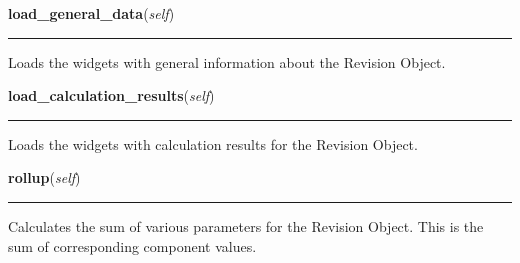 \hspace{.8\funcindent}\begin{boxedminipage}{\funcwidth}

    \raggedright \textbf{load\_general\_data}(\textit{self})

    \vspace{-1.5ex}

    \rule{\textwidth}{0.5\fboxrule}
\setlength{\parskip}{2ex}
    Loads the widgets with general information about the Revision Object.

\setlength{\parskip}{1ex}
    \end{boxedminipage}

    \label{reliafree:revision:Revision:load_calculation_results}

    \vspace{0.5ex}

\hspace{.8\funcindent}\begin{boxedminipage}{\funcwidth}

    \raggedright \textbf{load\_calculation\_results}(\textit{self})

    \vspace{-1.5ex}

    \rule{\textwidth}{0.5\fboxrule}
\setlength{\parskip}{2ex}
    Loads the widgets with calculation results for the Revision Object.

\setlength{\parskip}{1ex}
    \end{boxedminipage}

    \label{reliafree:revision:Revision:rollup}

    \vspace{0.5ex}

\hspace{.8\funcindent}\begin{boxedminipage}{\funcwidth}

    \raggedright \textbf{rollup}(\textit{self})

    \vspace{-1.5ex}

    \rule{\textwidth}{0.5\fboxrule}
\setlength{\parskip}{2ex}
    Calculates the sum of various parameters for the Revision Object. This 
    is the sum of corresponding component values.

\setlength{\parskip}{1ex}
    \end{boxedminipage}

